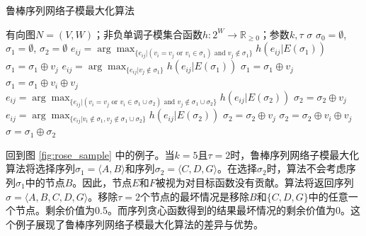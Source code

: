 \begin{algorithm}[H]
    \caption{鲁棒序列网络子模最大化算法 \label{alg:rosenets}}
    \begin{algorithmic}[1]
        \REQUIRE 有向图\(N = (V,W)\)；非负单调子模集合函数\(h: 2^W \rightarrow \mathbb{R}_{\ge 0}\)；参数$k, \tau$
        \ENSURE $\sigma$
        \STATE $\sigma_0=\emptyset$, $\sigma_1=\emptyset$, $\sigma_2=\emptyset$\;
         \label{alg:rose_line1}
                \STATE$e_{ij}=\arg\max_{\{e_{ij}|(v_i=v_j \text{ or } v_i \in \sigma_1) \text{ and } v_j\notin \sigma_1\}} h(e_{ij}|E(\sigma_1))$\;
                \STATE$\sigma_1 = \sigma_1 \oplus v_j$\;
            \ELSE
                \STATE $e_{ij}=\arg\max_{\{e_{ij}|v_j\notin \sigma_1\}} h(e_{ij}|E(\sigma_1))$\;
                    \STATE $\sigma_1 = \sigma_1 \oplus v_j$\;
                \ELSE
                    \STATE $\sigma_1 = \sigma_1 \oplus v_i \oplus v_j$\;
                \ENDIF
            \ENDIF
        \ENDWHILE \label{alg:rose_line2}
         \label{alg:rose_line3}
                \STATE $e_{ij}=\arg\max_{\{e_{ij}|(v_i=v_j \text{ or } v_i \in \sigma_1 \cup \sigma_2) \text{ and } v_j \notin \sigma_1 \cup \sigma_2\}} h(e_{ij}|E(\sigma_2))$\;
                \STATE $\sigma_2 = \sigma_2 \oplus v_j$\;
            \ELSE
                \STATE $e_{ij}=\arg\max_{\{e_{ij}|v_i\notin \sigma_1, v_j \notin \sigma_1 \cup \sigma_2\}} h(e_{ij}|E(\sigma_2))$\;
                    \STATE$\sigma_2 = \sigma_2 \oplus v_j$\;
                \ELSE
                    \STATE $\sigma_2 = \sigma_2 \oplus v_i \oplus v_j$\;
                \ENDIF
            \ENDIF
        \ENDWHILE \label{alg:rose_line4}
        \STATE $\sigma=\sigma_1\oplus \sigma_2$\;
    \end{algorithmic}
\end{algorithm}

回到图 \ref{fig:rose_sample} 中的例子。当\(k=5\)且\(\tau=2\)时，鲁棒序列网络子模最大化算法将选择序列\(\sigma_1=\langle A,B \rangle\)和序列\(\sigma_2=\langle C,D,G \rangle\)。在选择\(\sigma_2\)时，算法不会考虑序列\(\sigma_1\)中的节点\(B\)。因此，节点\(E\)和\(F\)被视为对目标函数没有贡献。算法将返回序列\(\sigma=\langle A,B,C,D,G \rangle\)。移除\(\tau=2\)个节点的最坏情况是移除\(B\)和\(\{C,D,G\}\)中的任意一个节点。剩余价值为0.5。而序列贪心函数得到的结果最坏情况的剩余价值为0。这个例子展现了鲁棒序列网络子模最大化算法的差异与优势。

